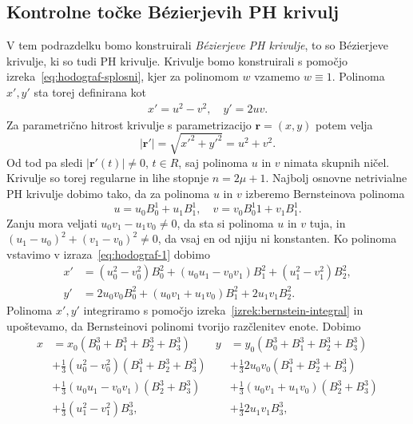 \documentclass[isrm2, tisk]{fmfdelo}
\begin{document}
    \subsection{Kontrolne točke Bézierjevih PH krivulj}
    V tem podrazdelku bomo konstruirali \textit{Bézierjeve PH krivulje}, to so Bézierjeve krivulje, ki so tudi PH krivulje.
    Krivulje bomo konstruirali s pomočjo izreka~\eqref{eq:hodograf-splosni}, kjer za polinomom $w$ vzamemo $w\equiv 1$.
    Polinoma $x',y'$ sta torej definirana kot
    \begin{align}
        x'=u^2-v^2,\quad y'=2uv.  \label{eq:hodograf-1}
    \end{align}
    Za parametrično hitrost krivulje s parametrizacijo $\mathbf{r}=(x,y)$ potem velja
    \[|\mathbf{r'}| =\sqrt{ x'^2 + y'^2} = u^2+v^2.\]
    Od tod pa sledi $|\mathbf{r'}(t)|\neq 0$, $t\in R$, saj polinoma $u$ in $v$ nimata skupnih ničel.
    Krivulje so torej regularne in lihe stopnje $n=2\mu+1$.
    Najbolj osnovne netrivialne PH krivulje dobimo tako, da za polinoma $u$ in $v$ izberemo Bernsteinova polinoma
    \[u=u_0B_{0}^{1}+u_1B_{1}^{1}, \quad v=v_0B^1_{0}{1}+v_1B_{1}^{1}.\]
    Zanju mora veljati $u_0v_1-u_1v_0\neq 0$, da sta si polinoma $u$ in $v$ tuja, in $(u_1-u_0)^2+(v_1-v_0)^2\neq 0$, da vsaj en od njiju ni konstanten.
    Ko polinoma vstavimo v izraza~\eqref{eq:hodograf-1} dobimo
    \begin{align*}
        x' &=(u_0^2-v_0^2)B_{0}^{2}+(u_0u_1-v_0v_1)B_{1}^{2} + (u_1^2-v_1^2)B_{2}^{2},\\
        y' &= 2u_0 v_0 B_{0}^{2}+(u_0v_1+u_1v_0)B_{1}^{2}+2u_1 v_1 B_{2}^{2}.
    \end{align*}
    Polinoma $x',y'$ integriramo s pomočjo izreka~\ref{izrek:bernstein-integral} in upoštevamo, da Bernsteinovi polinomi tvorijo razčlenitev enote.
    Dobimo
    \begin{align*}
        x &= x_0(B_{0}^{3} + B_{1}^{3} + B_{2}^{3}+ B_{3}^{3}) & y &= y_0(B_{0}^{3} + B_{1}^{3} + B_{2}^{3}+ B_{3}^{3}) \\
        &+ \frac{1}{3}(u_0^2-v_0^2)(B_{1}^{3} + B_{2}^{3}+ B_{3}^{3})    &     &+ \frac{1}{3}2u_0 v_0(B_{1}^{3} + B_{2}^{3}+ B_{3}^{3}) \\
        &+ \frac{1}{3}(u_0u_1-v_0v_1)(B_{2}^{3}+ B_{3}^{3})          &     &+ \frac{1}{3}(u_0v_1+u_1v_0)(B_{2}^{3}+ B_{3}^{3})\\
        &+ \frac{1}{3} (u_1^2-v_1^2)B_{3}^{3},                        &     &+ \frac{1}{3} 2u_1 v_1 B_{3}^{3},
    \end{align*}
\end{document}
